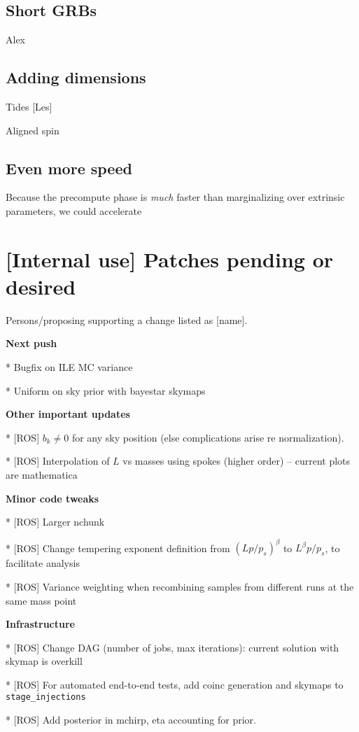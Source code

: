 \subsection{Short GRBs}

Alex

\subsection{Adding dimensions}

Tides [Les]

Aligned spin

\subsection{Even more speed}

Because the precompute phase is \emph{much} faster than marginalizing over extrinsic parameters, we could accelerate

\section{[Internal use] Patches pending or desired}

Persons/proposing supporting  a change listed as [name].

\noindent \textbf{Next push}

* Bugfix on ILE MC variance

* Uniform on sky prior with bayestar skymaps

\noindent \textbf{Other important updates}

*  [ROS]  $b_k \ne 0$ for any sky position (else complications arise re normalization).

* [ROS] Interpolation of $L$ vs masses using spokes (higher order) -- current plots are mathematica

\noindent \textbf{Minor code tweaks}

* [ROS] Larger nchunk

* [ROS] Change tempering exponent definition from $(Lp/p_s)^\beta$ to $L^\beta p/p_s$, to facilitate analysis

* [ROS] Variance weighting when recombining samples from different runs at the same mass point


\noindent \textbf{Infrastructure}

* [ROS] Change DAG (number of jobs, max iterations): current solution with skymap is overkill


* [ROS] For automated end-to-end tests, add \gstlal{} coinc generation and \BS{} skymaps to \texttt{stage\_injections}

* [ROS] Add posterior in mchirp, eta accounting for prior.
